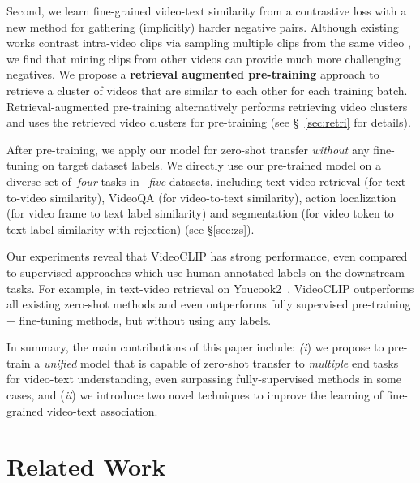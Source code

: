 \documentclass[11pt]{article}
\begin{document}
Second, we learn fine-grained video-text similarity from a contrastive loss with a new method for gathering (implicitly) harder negative pairs.
Although existing works contrast intra-video clips via sampling multiple clips from the same video \cite{miech2019howto100m,miech2020end}, we find that mining clips from other videos can provide much more challenging negatives.
We propose a \textbf{retrieval augmented pre-training} approach to retrieve a cluster of videos that are similar to each other for each training batch.
Retrieval-augmented pre-training alternatively performs retrieving video clusters and uses the retrieved video clusters for pre-training
(see \S~\ref{sec:retri} for details).

After pre-training, we apply our model for zero-shot transfer \textit{without} any fine-tuning on target dataset labels. We directly use our pre-trained model on a diverse set of~\textit{four} tasks in ~\textit{five} datasets, including text-video retrieval (for text-to-video similarity), VideoQA (for video-to-text similarity), 
action localization (for video frame to text label similarity) and segmentation (for video token to text label similarity with rejection) (see \S\ref{sec:zs}).

Our experiments reveal that VideoCLIP has strong performance, even compared to supervised approaches which use human-annotated labels on the downstream tasks. For example, in text-video retrieval on Youcook2~\cite{zhou2017towards}, VideoCLIP outperforms all existing zero-shot methods and even outperforms fully supervised pre-training + fine-tuning methods, but without using any labels.

In summary, the main contributions of this paper include: 
\textit{(i}) we propose to pre-train a \textit{unified} model that is capable of zero-shot transfer to \textit{multiple} end tasks for video-text understanding, even surpassing fully-supervised methods in some cases, and (\textit{ii}) we introduce two novel techniques to improve the learning of fine-grained video-text association.

\vspace{5pt}
\section{Related Work}
\label{sec:related_work}
\end{document}
